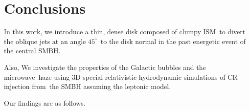 \documentclass[twocolumn]{aastex631}
\begin{document}
%
%
%
%
%



\section{Conclusions}
\label{Conclusions}
In this work, we introduce a thin, dense disk composed of clumpy ISM\
to divert the oblique jets at an angle $45^{\circ}$\
to the disk normal in the past energetic event of the central SMBH.


Also, We investigate the properties of the Galactic bubbles and the microwave\
haze using 3D special relativistic hydrodynamic simulations of CR injection from\
the SMBH assuming the leptonic model.


Our findings are as follows.
\end{document}
